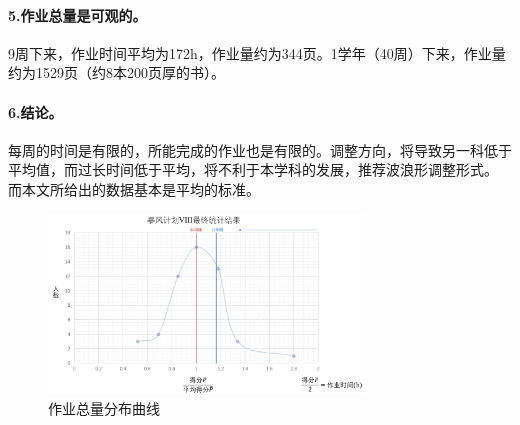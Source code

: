 \documentclass[a4paper,12pt]{article}
\begin{document}
\begin{CJK}{UTF8}{song}
\paragraph{5.作业总量是可观的。}
9周下来，作业时间平均为172h，作业量约为344页。1学年（40周）下来，作业量约为1529页（约8本200页厚的书）。

\paragraph{6.结论。} 每周的时间是有限的，所能完成的作业也是有限的。调整方向，将导致另一科低于平均值，而过长时间低于平均，将不利于本学科的发展，推荐波浪形调整形式。
而本文所给出的数据基本是平均的标准。 


\begin{figure}[H]
    \centering
    \includegraphics[width=0.75\textwidth]{img/6.png}
    \caption{作业总量分布曲线}
    \label{curve}
\end{figure}

\end{CJK}
\end{document}
